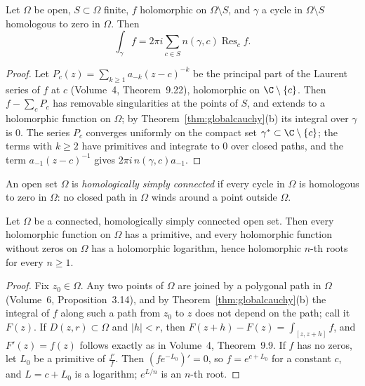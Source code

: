 \begin{corollary}\label{cor:globalresidue}
Let $\Omega$ be open, $S\subset\Omega$ finite, $f$ holomorphic on $\Omega\setminus S$, and $\gamma$ a cycle in $\Omega\setminus S$ homologous to zero in $\Omega$. Then
\[
\int_\gamma f=2\pi i\sum_{c\in S}n(\gamma,c)\operatorname{Res}_cf.
\]
\end{corollary}
\begin{proof}
Let $P_c(z)=\sum_{k\ge1}a_{-k}(z-c)^{-k}$ be the principal part of the Laurent series of $f$ at $c$ (Volume~4, Theorem~9.22), holomorphic on $\C\setminus\{c\}$. Then $f-\sum_cP_c$ has removable
singularities at the points of $S$, and extends to a holomorphic function on $\Omega$; by Theorem~\ref{thm:globalcauchy}(b) its integral over $\gamma$ is $0$. The series $P_c$ converges uniformly on the
compact set $\gamma^*\subset\C\setminus\{c\}$; the terms with $k\ge2$ have primitives and integrate to $0$ over closed paths, and the term $a_{-1}(z-c)^{-1}$ gives $2\pi i\,n(\gamma,c)a_{-1}$.
\end{proof}

An open set $\Omega$ is \emph{homologically simply connected} if every cycle in $\Omega$ is homologous to zero in $\Omega$: no closed path in $\Omega$ winds around a point outside $\Omega$.

\begin{corollary}\label{cor:hsc}
Let $\Omega$ be a connected, homologically simply connected open set. Then every holomorphic function on $\Omega$ has a primitive, and every holomorphic function without zeros on $\Omega$ has a
holomorphic logarithm, hence holomorphic $n$-th roots for every $n\ge1$.
\end{corollary}
\begin{proof}
Fix $z_0\in\Omega$. Any two points of $\Omega$ are joined by a polygonal path in $\Omega$ (Volume~6, Proposition~3.14), and by Theorem~\ref{thm:globalcauchy}(b) the integral of $f$ along such a path from
$z_0$ to $z$ does not depend on the path; call it $F(z)$. If $D(z,r)\subset\Omega$ and $|h|<r$, then $F(z+h)-F(z)=\int_{[z,z+h]}f$, and $F'(z)=f(z)$ follows exactly as in Volume~4, Theorem~9.9. If $f$
has no zeros, let $L_0$ be a primitive of $\frac{f'}f$. Then $(fe^{-L_0})'=0$, so $f=e^{c+L_0}$ for a constant $c$, and $L=c+L_0$ is a logarithm; $e^{L/n}$ is an $n$-th root.
\end{proof}


